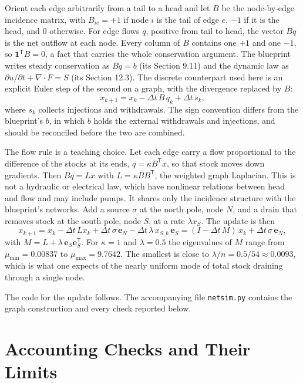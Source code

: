 Orient each edge arbitrarily from a tail to a head and let $B$ be the node-by-edge incidence matrix, with $B_{ie}=+1$ if node $i$ is the tail of edge $e$, $-1$ if it is the head, and $0$ otherwise. For edge flows $q$, positive from tail to head, the vector $Bq$ is the net outflow at each node. Every column of $B$ contains one $+1$ and one $-1$, so $\mathbf 1^{\mathsf T}B=0$, a fact that carries the whole conservation argument. The blueprint writes steady conservation as $Bq=b$ (its Section 9.11) and the dynamic law as $\partial u/\partial t+\nabla\!\cdot\!F=S$ (its Section 12.3). The discrete counterpart used here is an explicit Euler step of the second on a graph, with the divergence replaced by $B$:
\[
  x_{k+1}=x_k-\Delta t\,B\,q_k+\Delta t\,s_k,
\]
where $s_k$ collects injections and withdrawals. The sign convention differs from the blueprint's $b$, in which $b$ holds the external withdrawals and injections, and should be reconciled before the two are combined.

The flow rule is a teaching choice. Let each edge carry a flow proportional to the difference of the stocks at its ends, $q=\kappa B^{\mathsf T}x$, so that stock moves down gradients. Then $Bq=L x$ with $L=\kappa BB^{\mathsf T}$, the weighted graph Laplacian. This is not a hydraulic or electrical law, which have nonlinear relations between head and flow and may include pumps. It shares only the incidence structure with the blueprint's networks. Add a source $\sigma$ at the north pole, node $N$, and a drain that removes stock at the south pole, node $S$, at a rate $\lambda x_S$. The update is then
\[
  x_{k+1}=x_k-\Delta t\,L x_k+\Delta t\,\sigma\,\mathbf e_N-\Delta t\,\lambda\,x_{S,k}\,\mathbf e_S
  =(I-\Delta t\,M)\,x_k+\Delta t\,\sigma\,\mathbf e_N,
\]
with $M=L+\lambda\,\mathbf e_S\mathbf e_S^{\mathsf T}$. For $\kappa=1$ and $\lambda=0.5$ the eigenvalues of $M$ range from $\mu_{\min}=0.00837$ to $\mu_{\max}=9.7642$. The smallest is close to $\lambda/n=0.5/54\approx0.0093$, which is what one expects of the nearly uniform mode of total stock draining through a single node.

The code for the update follows. The accompanying file \texttt{netsim.py} contains the graph construction and every check reported below.



\section{Accounting Checks and Their Limits}


